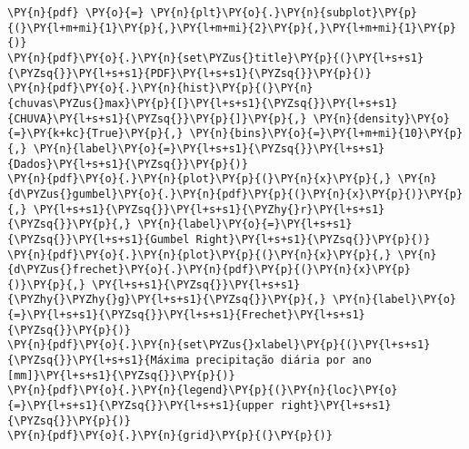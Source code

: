 \begin{tcolorbox}[breakable, size=fbox, boxrule=1pt, pad at break*=1mm,colback=cellbackground, colframe=cellborder]
\begin{Verbatim}[commandchars=\\\{\}]
\PY{n}{pdf} \PY{o}{=} \PY{n}{plt}\PY{o}{.}\PY{n}{subplot}\PY{p}{(}\PY{l+m+mi}{1}\PY{p}{,}\PY{l+m+mi}{2}\PY{p}{,}\PY{l+m+mi}{1}\PY{p}{)}
\PY{n}{pdf}\PY{o}{.}\PY{n}{set\PYZus{}title}\PY{p}{(}\PY{l+s+s1}{\PYZsq{}}\PY{l+s+s1}{PDF}\PY{l+s+s1}{\PYZsq{}}\PY{p}{)}
\PY{n}{pdf}\PY{o}{.}\PY{n}{hist}\PY{p}{(}\PY{n}{chuvas\PYZus{}max}\PY{p}{[}\PY{l+s+s1}{\PYZsq{}}\PY{l+s+s1}{CHUVA}\PY{l+s+s1}{\PYZsq{}}\PY{p}{]}\PY{p}{,} \PY{n}{density}\PY{o}{=}\PY{k+kc}{True}\PY{p}{,} \PY{n}{bins}\PY{o}{=}\PY{l+m+mi}{10}\PY{p}{,} \PY{n}{label}\PY{o}{=}\PY{l+s+s1}{\PYZsq{}}\PY{l+s+s1}{Dados}\PY{l+s+s1}{\PYZsq{}}\PY{p}{)}
\PY{n}{pdf}\PY{o}{.}\PY{n}{plot}\PY{p}{(}\PY{n}{x}\PY{p}{,} \PY{n}{d\PYZus{}gumbel}\PY{o}{.}\PY{n}{pdf}\PY{p}{(}\PY{n}{x}\PY{p}{)}\PY{p}{,} \PY{l+s+s1}{\PYZsq{}}\PY{l+s+s1}{\PYZhy{}r}\PY{l+s+s1}{\PYZsq{}}\PY{p}{,} \PY{n}{label}\PY{o}{=}\PY{l+s+s1}{\PYZsq{}}\PY{l+s+s1}{Gumbel Right}\PY{l+s+s1}{\PYZsq{}}\PY{p}{)}
\PY{n}{pdf}\PY{o}{.}\PY{n}{plot}\PY{p}{(}\PY{n}{x}\PY{p}{,} \PY{n}{d\PYZus{}frechet}\PY{o}{.}\PY{n}{pdf}\PY{p}{(}\PY{n}{x}\PY{p}{)}\PY{p}{,} \PY{l+s+s1}{\PYZsq{}}\PY{l+s+s1}{\PYZhy{}\PYZhy{}g}\PY{l+s+s1}{\PYZsq{}}\PY{p}{,} \PY{n}{label}\PY{o}{=}\PY{l+s+s1}{\PYZsq{}}\PY{l+s+s1}{Frechet}\PY{l+s+s1}{\PYZsq{}}\PY{p}{)}
\PY{n}{pdf}\PY{o}{.}\PY{n}{set\PYZus{}xlabel}\PY{p}{(}\PY{l+s+s1}{\PYZsq{}}\PY{l+s+s1}{Máxima precipitação diária por ano [mm]}\PY{l+s+s1}{\PYZsq{}}\PY{p}{)}
\PY{n}{pdf}\PY{o}{.}\PY{n}{legend}\PY{p}{(}\PY{n}{loc}\PY{o}{=}\PY{l+s+s1}{\PYZsq{}}\PY{l+s+s1}{upper right}\PY{l+s+s1}{\PYZsq{}}\PY{p}{)}
\PY{n}{pdf}\PY{o}{.}\PY{n}{grid}\PY{p}{(}\PY{p}{)}


\end{Verbatim}
\end{tcolorbox}
